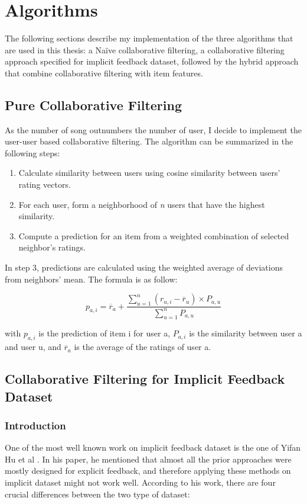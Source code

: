 \section{Algorithms}

The following sections describe my implementation of the three algorithms that are used in this thesis: a Na\"ive collaborative filtering, a collaborative filtering approach specified for implicit feedback dataset, followed by the hybrid approach that combine collaborative filtering with item features.

\subsection{Pure Collaborative Filtering}
As the number of song outnumbers the number of user, I decide to implement the user-user based collaborative filtering. The algorithm can be summarized in the following steps:

\begin{enumerate}
	\item Calculate similarity between users using cosine similarity between users' rating vectors. 
	\item For each user, form a neighborhood of \textit{n} users that have the highest similarity.
	\item Compute a prediction for an item from a weighted combination of selected neighbor's ratings. 
\end{enumerate}

In step 3, predictions are calculated using the weighted average of deviations from neighbors' mean. The formula is as follow:

\begin{displaymath}
p_{a,i} = \overline{r}_a + \frac{\sum_{u=1}^{n} (r_{u,i} - \overline{r}_{u}) \times P_{a,u}}{\sum_{u=1}^{n} P_{a,u}}  \tag{1} 
\end{displaymath}

with \(p_{a,i} \) is the prediction of item i for user a, \(P_{a,i}\) is the similarity between user a and user u, and \(\overline{r}_a\) is the average of the ratings of user a.  

\subsection{Collaborative Filtering for Implicit Feedback Dataset}

\subsubsection{Introduction}
One of the most well known work on implicit feedback dataset is the one of Yifan Hu et al \cite{hu2008collaborative}. In his paper, he mentioned that almost all the prior approaches were mostly designed for explicit feedback, and therefore applying these methods on implicit dataset might not work well. According to his work, there are four crucial differences between the two type of dataset:

